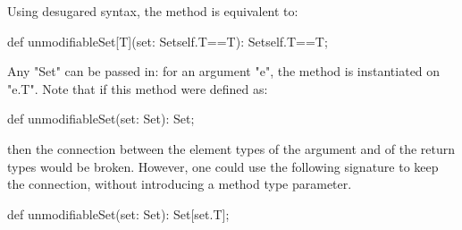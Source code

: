 Using desugared syntax, the method is
equivalent to: 
\begin{xten}
def unmodifiableSet[T](set: Set{self.T==T}): Set{self.T==T};
\end{xten}
Any \xcd"Set" can be passed in: for an argument \xcd"e", the method
is instantiated on \xcd"e.T".
%
Note that if this method were defined as:
\begin{xten}
def unmodifiableSet(set: Set): Set;
\end{xten}
then the connection between the element types of the
argument and of the return types would be broken.
However, one could use the following signature to keep the
connection, without introducing a method type parameter. 
\begin{xten}
def unmodifiableSet(set: Set): Set[set.T];
\end{xten}
